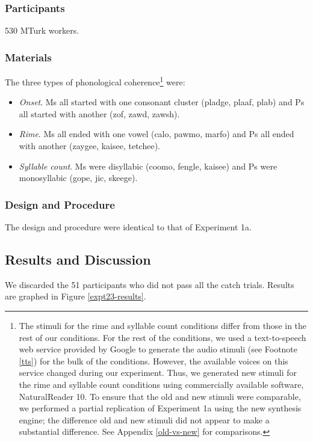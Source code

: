 \documentclass[man,floatsintext]{apa6}
\begin{document}
\subsubsection{Participants}
530 MTurk workers.

\subsubsection{Materials}
The three types of phonological coherence\footnote{\label{change-of-stimuli} The stimuli for the rime and syllable count conditions differ from those in the rest of our conditions. For the rest of the conditions, we used a text-to-speech web service provided by Google to generate the audio stimuli (see Footnote \ref{tts}) for the bulk of the conditions. However, the available voices on this service changed during our experiment. Thus, we generated new stimuli for the rime and syllable count conditions using commercially available software, NaturalReader 10. To ensure that the old and new stimuli were comparable, we performed a partial replication of Experiment 1a using the new synthesis engine; the difference old and new stimuli did not appear to make a substantial difference. See Appendix \ref{old-vs-new} for comparisons.} were:

\begin{itemize}
\item \emph{Onset}. Ms all started with one consonant cluster (pladge, plaaf, plab) and Ps all started with another (zof, zawd, zawsh).
\item \emph{Rime}. Ms all ended with one vowel (calo, pawmo, marfo) and Ps all ended with another (zaygee, kaisee, tetchee).
\item \emph{Syllable count}. Ms were disyllabic (coomo, fengle, kaisee) and Ps were monosyllabic (gope, jic, skeege).
\end{itemize}

\subsubsection{Design and Procedure}
The design and procedure were identical to that of Experiment 1a.

\subsection{Results and Discussion}

We discarded the 51 participants who did not pass all the catch trials. Results are graphed in Figure \ref{expt23-results}.
\end{document}
